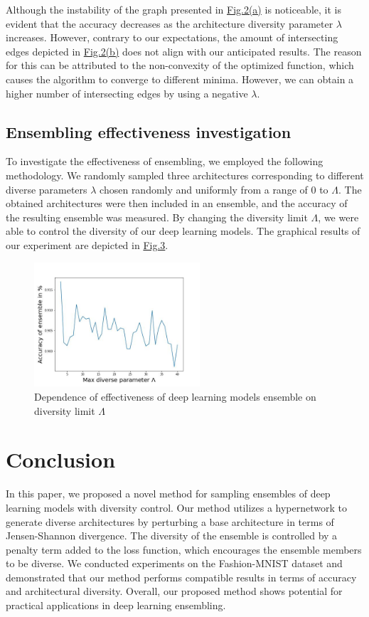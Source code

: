 \documentclass{article}
\begin{document}
Although the instability of the graph presented in \hyperref[fig:graph1]{Fig.2(a)} is noticeable, it is evident that the accuracy decreases as the architecture diversity parameter $\lambda$ increases.
However, contrary to our expectations, the amount of intersecting edges depicted in \hyperref[fig:graph2]{Fig.2(b)} does not align with our anticipated results.
The reason for this can be attributed to the non-convexity of the optimized function, which causes the algorithm to converge to different minima.
However, we can obtain a higher number of intersecting edges by using a negative $\lambda$.


\subsection{Ensembling effectiveness investigation}

To investigate the effectiveness of ensembling, we employed the following methodology.
We randomly sampled three architectures corresponding to different diverse parameters $\lambda$ chosen randomly and uniformly from a range of 0 to $\Lambda$.
The obtained architectures were then included in an ensemble, and the accuracy of the resulting ensemble was measured.
By changing the diversity limit $\Lambda$, we were able to control the diversity of our deep learning models.
The graphical results of our experiment are depicted in \hyperref[fig:graph3]{Fig.3}.

\begin{figure}[H]
    \centering
    \includegraphics[width=0.55\textwidth]{fig4}
    \caption{\label{fig:graph3} Dependence of effectiveness of deep learning models ensemble on diversity limit $\Lambda$}
\end{figure}

\section{Conclusion}

In this paper, we proposed a novel method for sampling ensembles of deep learning models with diversity control. Our method utilizes a hypernetwork to generate diverse architectures by perturbing a base architecture in terms of Jensen-Shannon divergence. The diversity of the ensemble is controlled by a penalty term added to the loss function, which encourages the ensemble members to be diverse. We conducted experiments on the Fashion-MNIST dataset and demonstrated that our method performs compatible results in terms of accuracy and architectural diversity. Overall, our proposed method shows potential for practical applications in deep learning ensembling.


\end{document}
